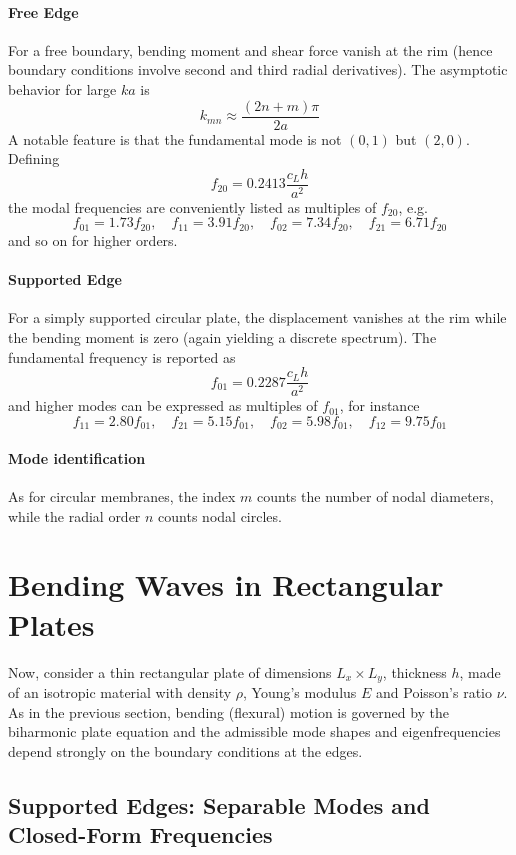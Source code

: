 \paragraph{Free Edge} For a free boundary, bending moment and shear force vanish at the rim (hence boundary conditions involve second and third radial derivatives). The asymptotic behavior for large \( ka \) is
\[
k_{mn} \approx \frac{(2n+m)\pi}{2a}
\]
A notable feature is that the fundamental mode is not \( (0,1) \) but \( (2,0) \). Defining
\[
f_{20} = 0.2413\frac{c_L h}{a^{2}}
\]
the modal frequencies are conveniently listed as multiples of \( f_{20} \), e.g.
\[
f_{01} = 1.73f_{20},\quad f_{11} = 3.91f_{20},\quad
f_{02} = 7.34f_{20},\quad f_{21} = 6.71f_{20}
\]
and so on for higher orders. 

\paragraph{Supported Edge} For a simply supported circular plate, the displacement vanishes at the rim while the bending moment is zero (again yielding a discrete spectrum). The fundamental frequency is reported as
\[
f_{01} = 0.2287\frac{c_L h}{a^{2}}
\]
and higher modes can be expressed as multiples of \( f_{01} \), for instance
\[
f_{11} = 2.80f_{01},\quad
f_{21} = 5.15f_{01},\quad
f_{02} = 5.98f_{01},\quad
f_{12} = 9.75f_{01}
\]

\paragraph{Mode identification} As for circular membranes, the index \( m \) counts the number of nodal diameters, while the radial order \( n \) counts nodal circles.

\section{Bending Waves in Rectangular Plates}

Now, consider a thin rectangular plate of dimensions \( L_x \times L_y \), thickness \( h \), made of an isotropic material with density \( \rho \), Young's modulus \( E \) and Poisson's ratio \( \nu \). As in the previous section, bending (flexural) motion is governed by the biharmonic plate equation and the admissible mode shapes and eigenfrequencies depend strongly on the boundary conditions at the edges. 

\subsection{Supported Edges: Separable Modes and Closed-Form Frequencies}

